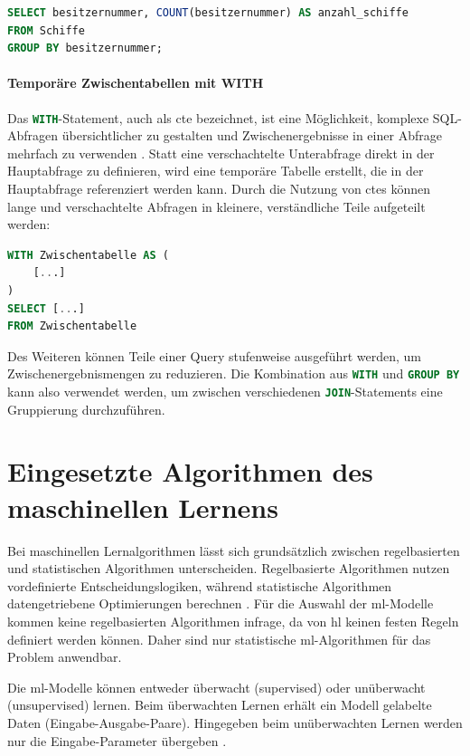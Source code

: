 \begin{lstlisting}[language=SQL]
SELECT besitzernummer, COUNT(besitzernummer) AS anzahl_schiffe
FROM Schiffe
GROUP BY besitzernummer;
\end{lstlisting}

\paragraph{Temporäre Zwischentabellen mit WITH}
Das \lstinline[language=SQL]|WITH|-Statement, auch als \gls{cte} bezeichnet, ist eine Möglichkeit, komplexe SQL-Abfragen übersichtlicher zu gestalten und Zwischenergebnisse in einer Abfrage mehrfach zu verwenden \cite{Horvat2008}.  
Statt eine verschachtelte Unterabfrage direkt in der Hauptabfrage zu definieren, wird eine temporäre Tabelle erstellt, die in der Hauptabfrage referenziert werden kann.
Durch die Nutzung von \glspl{cte} können lange und verschachtelte Abfragen in kleinere, verständliche Teile aufgeteilt werden:
\begin{lstlisting}[language=SQL]
WITH Zwischentabelle AS (
    [...]
) 
SELECT [...]
FROM Zwischentabelle
\end{lstlisting}

Des Weiteren können Teile einer Query stufenweise ausgeführt werden, um Zwischenergebnismengen zu reduzieren.
Die Kombination aus \lstinline[language=SQL]|WITH| und 
\lstinline[language=SQL]|GROUP BY|
kann also verwendet werden, um zwischen verschiedenen \lstinline[language=SQL]|JOIN|-Statements eine Gruppierung durchzuführen.

\section{Eingesetzte Algorithmen des maschinellen Lernens}

Bei maschinellen Lernalgorithmen lässt sich grundsätzlich zwischen regelbasierten und statistischen Algorithmen unterscheiden.
Regelbasierte Algorithmen nutzen vordefinierte Entscheidungslogiken, während statistische Algorithmen datengetriebene Optimierungen berechnen \cite{RussellNorvig2020}. 
Für die Auswahl der \gls{ml}-Modelle kommen keine regelbasierten Algorithmen infrage, da von \gls{hl} keinen festen Regeln definiert werden können.
Daher sind nur statistische \gls{ml}-Algorithmen für das Problem anwendbar. 

Die \gls{ml}-Modelle können entweder überwacht (supervised) oder unüberwacht (unsupervised) lernen. 
Beim überwachten Lernen erhält ein Modell gelabelte Daten (Eingabe-Ausgabe-Paare).
Hingegeben beim unüberwachten Lernen werden nur die Eingabe-Parameter übergeben \cite{Goodfellow2016}.

